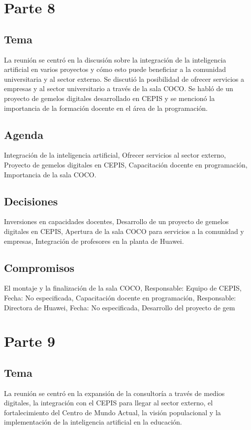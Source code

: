 \documentclass{article}
\begin{document}
\section{Parte 8}
\subsection{Tema}
La reunión se centró en la discusión sobre la integración de la inteligencia artificial en varios proyectos y cómo esto puede beneficiar a la comunidad universitaria y al sector externo. Se discutió la posibilidad de ofrecer servicios a empresas y al sector universitario a través de la sala COCO. Se habló de un proyecto de gemelos digitales desarrollado en CEPIS y se mencionó la importancia de la formación docente en el área de la programación.

\subsection{Agenda}
Integración de la inteligencia artificial, Ofrecer servicios al sector externo, Proyecto de gemelos digitales en CEPIS, Capacitación docente en programación, Importancia de la sala COCO.

\subsection{Decisiones}
Inversiones en capacidades docentes, Desarrollo de un proyecto de gemelos digitales en CEPIS, Apertura de la sala COCO para servicios a la comunidad y empresas, Integración de profesores en la planta de Huawei.

\subsection{Compromisos}
El montaje y la finalización de la sala COCO, Responsable: Equipo de CEPIS, Fecha: No especificada, Capacitación docente en programación, Responsable: Directora de Huawei, Fecha: No especificada, Desarrollo del proyecto de gem
\section{Parte 9}
\subsection{Tema}
La reunión se centró en la expansión de la consultoría a través de medios digitales, la integración con el CEPIS para llegar al sector externo, el fortalecimiento del Centro de Mundo Actual, la visión populacional y la implementación de la inteligencia artificial en la educación.
\end{document}
